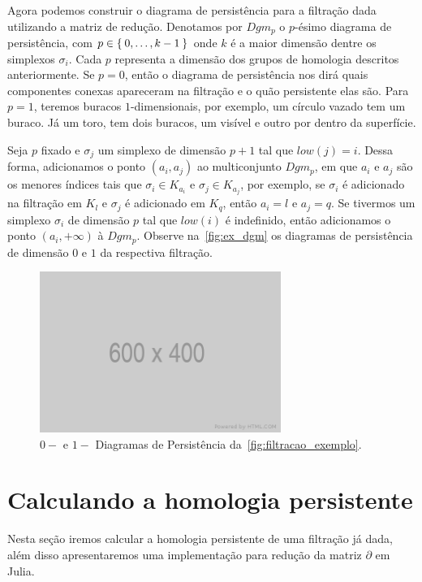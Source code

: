 Agora podemos construir o diagrama de persistência para a filtração dada
utilizando a matriz de redução. Denotamos por $Dgm_p$ o $p$-ésimo diagrama
de persistência, com $p \in \Set{0,\dots,k-1}$ onde $k$ é a maior dimensão
dentre os simplexos $\sigma_i$. Cada $p$ representa a dimensão dos grupos de
homologia descritos anteriormente. Se $p=0$, então o diagrama de persistência
nos dirá quais componentes conexas apareceram na filtração e o quão persistente
elas são. Para $p=1$, teremos buracos $1$-dimensionais, por exemplo, um círculo
vazado tem um buraco. Já um toro, tem dois buracos, um visível e outro por
dentro da superfície.

Seja $p$ fixado e $\sigma_j$ um simplexo de dimensão $p+1$ tal que $low(j)=i$.
Dessa forma, adicionamos o ponto $(a_i, a_j)$ ao multiconjunto $Dgm_p$, em que
$a_i$ e $a_j$ são os menores índices tais que $\sigma_i \in K_{a_i}$ e $\sigma_j
\in K_{a_j}$, por exemplo, se $\sigma_i$ é adicionado na filtração em $K_l$ e
$\sigma_j$ é adicionado em $K_q$, então $a_i = l$ e $a_j = q$. Se tivermos um
simplexo $\sigma_i$ de dimensão $p$ tal que $low(i)$ é indefinido, então
adicionamos o ponto $(a_i, +\infty)$ à $Dgm_p$. Observe na~\autoref{fig:ex_dgm}
os diagramas de persistência de dimensão $0$ e $1$ da respectiva filtração.
\begin{figure}[htb]
  \centering
  \includegraphics[width=0.7\textwidth]{images/placeholder.png}
  \caption{$0-$ e $1-$ Diagramas de Persistência da~\autoref{fig:filtracao_exemplo}.}
  \label{fig:ex_dgm}
  \fautor
\end{figure}

\section{Calculando a homologia persistente}
Nesta seção iremos calcular a homologia persistente de uma filtração já dada,
além disso apresentaremos uma implementação para redução da matriz $\partial$
em Julia.

